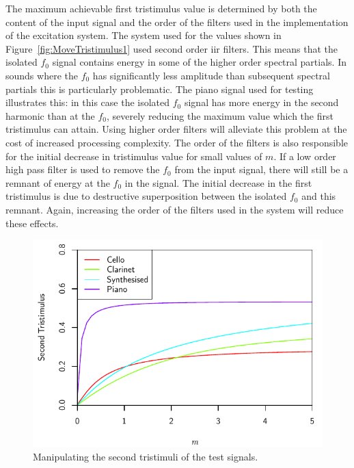 		The maximum achievable first tristimulus value is determined by both the content of the input signal and
		the order of the filters used in the implementation of the excitation system. The system used for the
		values shown in Figure~\ref{fig:MoveTristimulus1} used second order \acrshort{iir} filters. This means that
		the isolated $f_{0}$ signal contains energy in some of the higher order spectral partials. In sounds where
		the $f_{0}$ has significantly less amplitude than subsequent spectral partials this is particularly
		problematic. The piano signal used for testing illustrates this: in this case the isolated $f_{0}$ signal
		has more energy in the second harmonic than at the $f_{0}$, severely reducing the maximum value which the
		first tristimulus can attain. Using higher order filters will alleviate this problem at the cost of
		increased processing complexity. The order of the filters is also responsible for the initial decrease in
		tristimulus value for small values of $m$. If a low order high pass filter is used to remove the $f_{0}$
		from the input signal, there will still be a remnant of energy at the $f_{0}$ in the signal. The initial
		decrease in the first tristimulus is due to destructive superposition between the isolated $f_{0}$ and this
		remnant. Again, increasing the order of the filters used in the system will reduce these effects.

		\begin{figure}[h!]
			\centering
			\includegraphics{chapter6/Images/MoveTristimulus2.pdf}
			\caption{Manipulating the second tristimuli of the test signals.}
			\label{fig:MoveTristimulus2}
		\end{figure}

